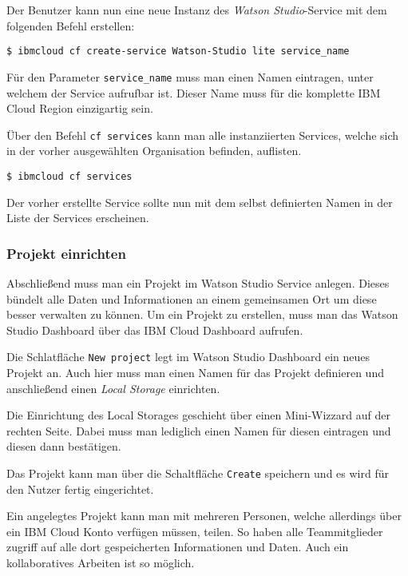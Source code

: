 Der Benutzer kann nun eine neue Instanz des \textit{Watson Studio}-Service mit dem folgenden Befehl erstellen:

\begin{lstlisting}[caption=Instanziierung des Watson Studio Services, label=ls:vorbereitung_watsonservice]
    $ ibmcloud cf create-service Watson-Studio lite service_name
\end{lstlisting}

Für den Parameter \texttt{service\_name} muss man einen Namen eintragen, unter welchem der Service aufrufbar ist.
Dieser Name muss für die komplette IBM Cloud Region einzigartig sein.

Über den Befehl \texttt{cf services} kann man alle instanziierten Services, welche sich in der vorher ausgewählten
Organisation befinden, auflisten.

\begin{lstlisting}[caption=Auflisten aller Services in einer Organisation, label=ls:vorbereitung_alleservices]
    $ ibmcloud cf services
\end{lstlisting}

Der vorher erstellte Service sollte nun mit dem selbst definierten Namen in der Liste der Services erscheinen.

\subsubsection{Projekt einrichten}
Abschließend muss man ein Projekt im Watson Studio Service anlegen. Dieses bündelt alle Daten und Informationen an einem
gemeinsamen Ort um diese besser verwalten zu können. Um ein Projekt zu erstellen, muss man das Watson Studio Dashboard
über das IBM Cloud Dashboard aufrufen.

Die Schlatfläche \texttt{New project} legt im Watson Studio Dashboard ein neues Projekt an. Auch hier muss man einen
Namen für das Projekt definieren und anschließend einen \textit{Local Storage} einrichten.

Die Einrichtung des Local Storages geschieht über einen Mini-Wizzard auf der rechten Seite. Dabei muss man lediglich
einen Namen für diesen eintragen und diesen dann bestätigen.

Das Projekt kann man über die Schaltfläche \texttt{Create} speichern und es wird für den Nutzer fertig eingerichtet.

Ein angelegtes Projekt kann man mit mehreren Personen, welche allerdings über ein IBM Cloud Konto verfügen müssen,
teilen. So haben alle Teammitglieder zugriff auf alle dort gespeicherten Informationen und Daten. Auch ein
kollaboratives Arbeiten ist so möglich.

